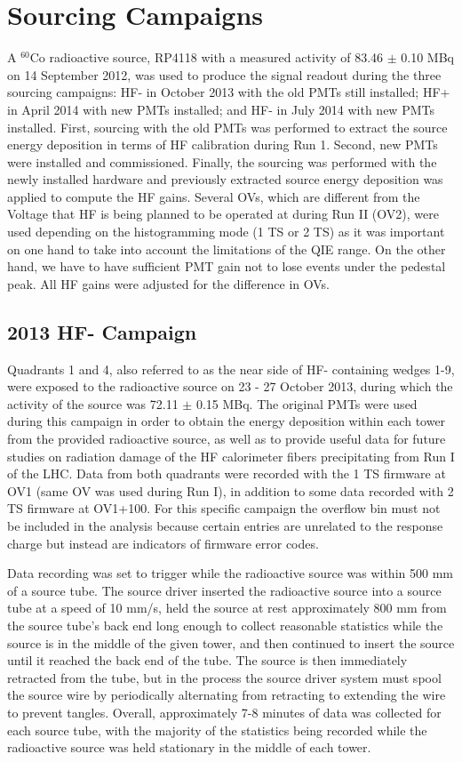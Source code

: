 \section{Sourcing Campaigns}
A $^{60}$Co radioactive source, RP4118 with a measured activity of 83.46 $\pm$
0.10 MBq on 14 September 2012, was used to produce the signal readout
during the three sourcing campaigns: HF- in October 2013 with the old PMTs still
installed; HF+ in April 2014 with new PMTs installed; and HF- in July 2014 with
new PMTs installed. First, sourcing with the old PMTs was performed to extract
the source energy deposition in terms of HF calibration during Run 1. Second, new PMTs were installed and commissioned. Finally, the sourcing was performed with the newly installed hardware and previously extracted source energy deposition was applied to compute the HF gains. Several OVs, which are different from the Voltage that HF is being planned to be operated at during Run II (OV2), were used depending on the histogramming mode (1 TS or 2 TS) as it was important on one hand to take into account the limitations of the QIE range. On the other hand, we have to have sufficient PMT gain not to lose events under the pedestal peak. All HF gains were adjusted for the difference in OVs.

\subsection{2013 HF- Campaign}
Quadrants 1 and 4, also referred to as the near side of HF- containing wedges
1-9, were exposed to the radioactive source on 23 - 27 October 2013, during
which the activity of the source was 72.11 $\pm$ 0.15 MBq. The original
PMTs were used during this campaign in order to obtain the energy deposition
within each tower from the provided radioactive source, as well as to provide
useful data for future studies on radiation damage of the HF calorimeter fibers
precipitating from Run I of the LHC. Data from both quadrants were recorded
with the 1 TS firmware at OV1 (same OV was used during Run I), in
addition to some data recorded with 2 TS firmware at OV1+100. For this
specific campaign the overflow bin must not be included in the analysis
because certain entries are unrelated to the response charge but instead are
indicators of firmware error codes.

Data recording was set to trigger while the radioactive source was within 500 mm
of a source tube. The source driver inserted the radioactive source into a source
tube at a speed of 10 mm/s, held the source at rest approximately 800 mm
from the source tube's back end long enough to collect reasonable statistics
while the source is in the middle of the given tower, and then continued to
insert the source until it reached the back end of the tube. The source is then
immediately retracted from the tube, but in the process the source driver system
must spool the source wire by periodically alternating from retracting to extending the wire to prevent tangles. Overall, approximately 7-8 minutes of data was collected for each source tube, with the majority of the statistics being recorded while the radioactive source was held stationary in the middle of each tower.

